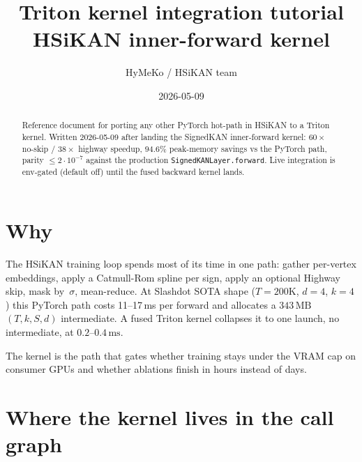 \documentclass[11pt,a4paper]{article}
\title{\bfseries Triton kernel integration tutorial \\
       \large HSiKAN inner-forward kernel}
\author{HyMeKo / HSiKAN team}
\date{2026-05-09}
\begin{document}
\maketitle

\begin{abstract}
\noindent Reference document for porting any other PyTorch hot-path
in HSiKAN to a Triton kernel. Written 2026-05-09 after landing the
SignedKAN inner-forward kernel: $60\times$ no-skip / $38\times$
highway speedup, $94.6\%$ peak-memory savings vs the PyTorch path,
parity $\le 2 \cdot 10^{-7}$ against the production
\texttt{SignedKANLayer.forward}. Live integration is env-gated
(default off) until the fused backward kernel lands.
\end{abstract}

\tableofcontents
\bigskip

\section{Why}

The HSiKAN training loop spends most of its time in one path: gather
per-vertex embeddings, apply a Catmull-Rom spline per sign, apply an
optional Highway skip, mask by~$\sigma$, mean-reduce. At Slashdot SOTA
shape ($T=200\text{K}$, $d=4$, $k=4$) this PyTorch path costs
11--17\,ms per forward and allocates a $343\,\text{MB}$
$(T,k,S,d)$ intermediate. A fused Triton kernel collapses it to one
launch, no intermediate, at $0.2$--$0.4\,\text{ms}$.

The kernel is the path that gates whether training stays under the VRAM
cap on consumer GPUs and whether ablations finish in hours instead of
days.

\section{Where the kernel lives in the call graph}
\end{document}
